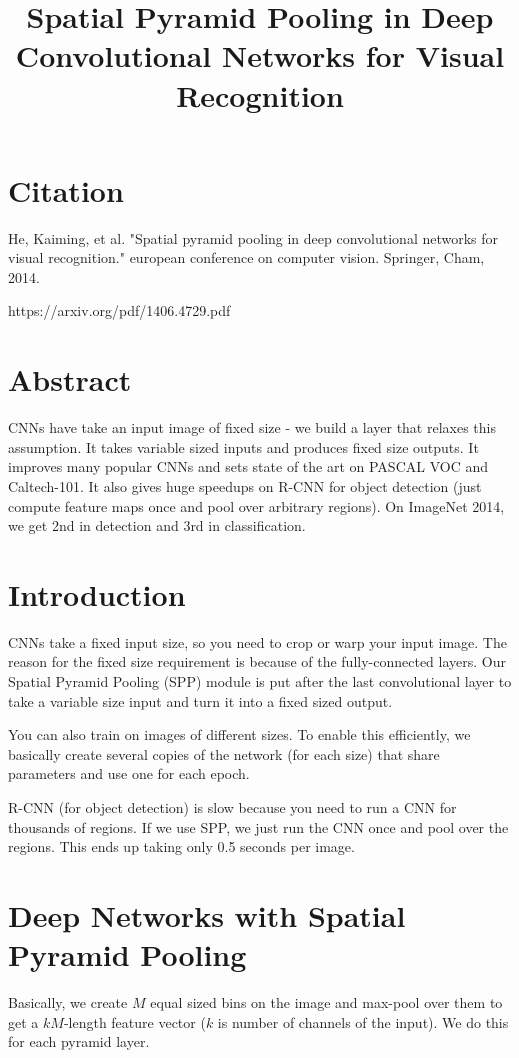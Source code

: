 \documentclass[a4paper]{article}
\title{Spatial Pyramid Pooling in Deep Convolutional Networks for Visual
Recognition}
\date{}
\begin{document}
\maketitle

\section{Citation}

He, Kaiming, et al. "Spatial pyramid pooling in deep convolutional networks for visual recognition." european conference on computer vision. Springer, Cham, 2014.

https://arxiv.org/pdf/1406.4729.pdf

\section{Abstract}
CNNs have take an input image of fixed size - we build a layer that relaxes
this assumption. It takes variable sized inputs and produces fixed size outputs.
It improves many popular CNNs and sets state of the art on PASCAL VOC and
Caltech-101. It also gives huge speedups on R-CNN for object detection (just
compute feature maps once and pool over arbitrary regions). On ImageNet 2014,
we get 2nd in detection and 3rd in classification.

\section{Introduction}
CNNs take a fixed input size, so you need to crop or warp your input image. The
reason for the fixed size requirement is because of the fully-connected
layers. Our Spatial Pyramid Pooling (SPP) module is put after the last
convolutional layer to take a variable size input and turn it into a fixed
sized output.

You can also train on images of different sizes. To enable this efficiently,
we basically create several copies of the network (for each size) that share
parameters and use one for each epoch.

R-CNN (for object detection) is slow because you need to run a CNN for
thousands of regions. If we use SPP, we just run the CNN once and pool
over the regions. This ends up taking only 0.5 seconds per image.

\section{Deep Networks with Spatial Pyramid Pooling}
Basically, we create $M$ equal sized bins on the image and max-pool over them
to get a $kM$-length feature vector ($k$ is number of channels of the input).
We do this for each pyramid layer.
\end{document}
